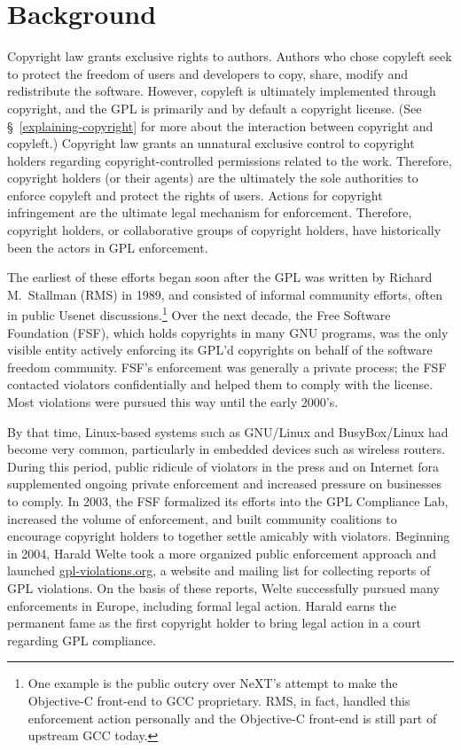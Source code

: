 \chapter{Background}

Copyright law grants exclusive rights to authors.  Authors who chose copyleft
seek to protect the freedom of users and developers to copy, share, modify
and redistribute the software.  However, copyleft is ultimately implemented
through copyright, and the GPL is primarily and by default a copyright
license.  (See \S~\ref{explaining-copyright} for more about the interaction
between copyright and copyleft.)  Copyright law grants an unnatural exclusive
control to copyright holders regarding copyright-controlled permissions
related to the work.  Therefore, copyright holders (or their agents) are the
ultimately the sole authorities to enforce copyleft and protect the rights of
users.  Actions for copyright infringement are the ultimate legal mechanism
for enforcement.  Therefore, copyright holders, or collaborative groups of
copyright holders, have historically been the actors in GPL enforcement.

The earliest of these efforts began soon after the GPL was written by
Richard M.~Stallman (RMS) in 1989, and consisted of informal community efforts,
often in public Usenet discussions.\footnote{One example is the public
  outcry over NeXT's attempt to make the Objective-C front-end to GCC
  proprietary.  RMS, in fact, handled this enforcement action personally and
  the Objective-C front-end is still part of upstream GCC today.}  Over the next decade, the Free Software Foundation (FSF),
which holds copyrights in many GNU programs, was the only visible entity
actively enforcing its GPL'd copyrights on behalf of the software freedom
community.
FSF's enforcement
was generally a private process; the FSF contacted violators
confidentially and helped them to comply with the license.  Most
violations were pursued this way until the early 2000's.

By that time, Linux-based systems such as GNU/Linux and BusyBox/Linux had become very common, particularly in
embedded devices such as wireless routers.  During this period, public
ridicule of violators in the press and on Internet fora supplemented
ongoing private enforcement and increased pressure on businesses to
comply.  In 2003, the FSF formalized its efforts into the GPL Compliance
Lab, increased the volume of enforcement, and built community coalitions
to encourage copyright holders to together settle amicably with violators.
Beginning in 2004, Harald Welte took a more organized public enforcement
approach and launched \href{http://gpl-violations.org/}{gpl-violations.org}, a website and mailing
list for collecting reports of GPL violations.  On the basis of these
reports, Welte successfully pursued many enforcements in Europe, including
formal legal action.  Harald earns the permanent fame as the first copyright
holder to bring legal action in a court regarding GPL compliance.

